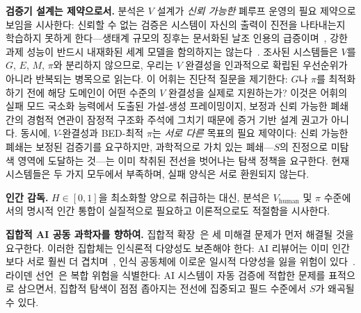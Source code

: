 \documentclass[11pt]{article}
\begin{document}
\textbf{검증기 설계는 제약으로서.} 분석은 $V$ 설계가 \emph{신뢰 가능한} 폐루프 운영의 필요 제약으로 보임을 시사한다: 신뢰할 수 없는 검증은 시스템이 자신의 출력이 진전을 나타내는지 학습하지 못하게 한다---생태계 규모의 징후는 문서화된 날조 인용의 급증이며~\citep{zhao2026hallucinations}, 강한 과제 성능이 반드시 내재화된 세계 모델을 함의하지는 않는다~\citep{vafa2025foundationmodel}. 조사된 시스템들은 $V$를 $G$, $E$, $M$, $\pi$와 분리하지 않으므로, 우리는 $V$ 완결성을 인과적으로 확립된 우선순위가 아니라 반복되는 병목으로 읽는다. 이 어휘는 진단적 질문을 제기한다: $G$나 $\pi$를 최적화하기 전에 해당 도메인이 어떤 수준의 $V$ 완결성을 실제로 지원하는가? 이것은 어휘의 실패 모드 국소화 능력에서 도출된 가설-생성 프레이밍이지, 보정과 신뢰 가능한 폐쇄 간의 경험적 연관이 잠정적 구조화 주석에 그치기 때문에 증거 기반 설계 권고가 아니다. 동시에, $V$-완결성과 BED-최적 $\pi$는 \emph{서로 다른} 목표의 필요 제약이다: 신뢰 가능한 폐쇄는 보정된 검증기를 요구하지만, 과학적으로 가치 있는 폐쇄---$S$의 진정으로 미탐색 영역에 도달하는 것---는 이미 착취된 전선을 벗어나는 탐색 정책을 요구한다. 현재 시스템들은 두 가지 모두에서 부족하며, 실패 양식은 서로 환원되지 않는다.

\textbf{인간 감독.} $H \in [0,1]$을 최소화할 양으로 취급하는 대신, 분석은 $V_\text{human}$ 및 $\pi$ 수준에서의 명시적 인간 통합이 실질적으로 필요하고 이론적으로도 적절함을 시사한다.

\textbf{집합적 AI 공동 과학자를 향하여.} 집합적 확장~\citep{taniguchi2024cpc}은 세 미해결 문제가 먼저 해결될 것을 요구한다. 이러한 집합체는 인식론적 다양성도 보존해야 한다: AI 리뷰어는 이미 인간보다 서로 훨씬 더 겹치며~\citep{kim2026aireviewers}, 인식 공동체에 이로운 일시적 다양성을 잃을 위험이 있다~\citep{zollman2010epistemic}. 라이덴 선언~\citep{leiden2026}은 복합 위험을 식별한다: AI 시스템이 자동 검증에 적합한 문제를 표적으로 삼으면서, 집합적 탐색이 점점 좁아지는 전선에 집중되고 필드 수준에서 $S$가 왜곡될 수 있다.
\end{document}
